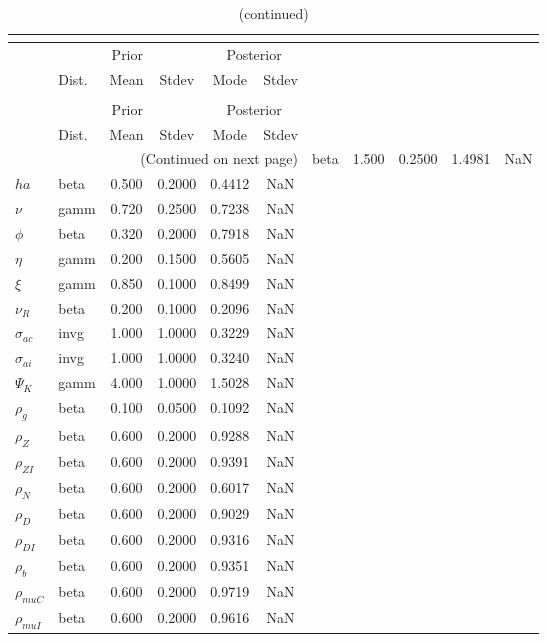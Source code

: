  
\begin{center}
\begin{longtable}{llcccc} 
\caption{Results from posterior maximization (parameters)}\\
 \label{Table:Posterior:1}\\
\toprule 
  & \multicolumn{3}{c}{Prior}  &  \multicolumn{2}{c}{Posterior} \\
  \cmidrule(r{.75em}){2-4} \cmidrule(r{.75em}){5-6}
  & Dist. & Mean  & Stdev & Mode & Stdev \\ 
\midrule \endfirsthead 
\caption{(continued)}\\
 \bottomrule 
  & \multicolumn{3}{c}{Prior}  &  \multicolumn{2}{c}{Posterior} \\
  \cmidrule(r{.75em}){2-4} \cmidrule(r{.75em}){5-6}
  & Dist. & Mean  & Stdev & Mode & Stdev \\ 
\midrule \endhead 
\bottomrule \multicolumn{6}{r}{(Continued on next page)}\endfoot 
\bottomrule\endlastfoot 
${\sigma}$ & beta &   1.500 & 0.2500 &   1.4981 &     NaN \\ 
${ha}$ & beta &   0.500 & 0.2000 &   0.4412 &     NaN \\ 
$\nu$ & gamm &   0.720 & 0.2500 &   0.7238 &     NaN \\ 
${\phi}$ & beta &   0.320 & 0.2000 &   0.7918 &     NaN \\ 
${\eta}$ & gamm &   0.200 & 0.1500 &   0.5605 &     NaN \\ 
$\xi$ & gamm &   0.850 & 0.1000 &   0.8499 &     NaN \\ 
${\nu_R}$ & beta &   0.200 & 0.1000 &   0.2096 &     NaN \\ 
${\sigma_{ac}}$ & invg &   1.000 & 1.0000 &   0.3229 &     NaN \\ 
${\sigma_{ai}}$ & invg &   1.000 & 1.0000 &   0.3240 &     NaN \\ 
${\Psi_{K}}$ & gamm &   4.000 & 1.0000 &   1.5028 &     NaN \\ 
${\rho_g}$ & beta &   0.100 & 0.0500 &   0.1092 &     NaN \\ 
${\rho_Z}$ & beta &   0.600 & 0.2000 &   0.9288 &     NaN \\ 
${\rho_{ZI}}$ & beta &   0.600 & 0.2000 &   0.9391 &     NaN \\ 
${\rho_N}$ & beta &   0.600 & 0.2000 &   0.6017 &     NaN \\ 
${\rho_D}$ & beta &   0.600 & 0.2000 &   0.9029 &     NaN \\ 
${\rho_{DI}}$ & beta &   0.600 & 0.2000 &   0.9316 &     NaN \\ 
${\rho_b}$ & beta &   0.600 & 0.2000 &   0.9351 &     NaN \\ 
${\rho_{muC}}$ & beta &   0.600 & 0.2000 &   0.9719 &     NaN \\ 
${\rho_{muI}}$ & beta &   0.600 & 0.2000 &   0.9616 &     NaN \\ 
\end{longtable}
 \end{center}
